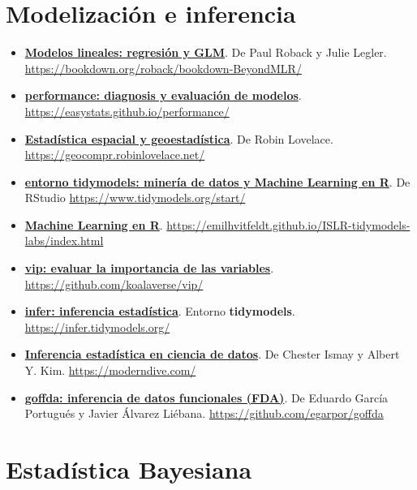 \documentclass[11pt,]{book}
\begin{document}
\hypertarget{modelizaciuxf3n-e-inferencia}{%
\section*{Modelización e inferencia}\label{modelizaciuxf3n-e-inferencia}}


\begin{itemize}
\item
  \href{https://bookdown.org/roback/bookdown-BeyondMLR/}{\textbf{Modelos lineales: regresión y GLM}}. De Paul Roback y Julie Legler. \url{https://bookdown.org/roback/bookdown-BeyondMLR/}
\item
  \href{https://easystats.github.io/performance/}{\textbf{performance: diagnosis y evaluación de modelos}}. \url{https://easystats.github.io/performance/}
\item
  \href{https://geocompr.robinlovelace.net/}{\textbf{Estadística espacial y geoestadística}}. De Robin Lovelace. \url{https://geocompr.robinlovelace.net/}
\item
  \href{https://www.tidymodels.org/start/}{\textbf{entorno tidymodels: minería de datos y Machine Learning en R}}. De RStudio \url{https://www.tidymodels.org/start/}
\item
  \href{https://emilhvitfeldt.github.io/ISLR-tidymodels-labs/index.html}{\textbf{Machine Learning en R}}. \url{https://emilhvitfeldt.github.io/ISLR-tidymodels-labs/index.html}
\item
  \href{https://github.com/koalaverse/vip/}{\textbf{vip: evaluar la importancia de las variables}}. \url{https://github.com/koalaverse/vip/}
\item
  \href{https://infer.tidymodels.org/}{\textbf{infer: inferencia estadística}}. Entorno \textbf{tidymodels}. \url{https://infer.tidymodels.org/}
\item
  \href{https://moderndive.com/}{\textbf{Inferencia estadística en ciencia de datos}}. De Chester Ismay y Albert Y. Kim. \url{https://moderndive.com/}
\item
  \href{https://github.com/egarpor/goffda}{\textbf{goffda: inferencia de datos funcionales (FDA)}}. De Eduardo García Portugués y Javier Álvarez Liébana. \url{https://github.com/egarpor/goffda}
\end{itemize}

\hypertarget{estaduxedstica-bayesiana}{%
\section*{Estadística Bayesiana}\label{estaduxedstica-bayesiana}}
\end{document}
